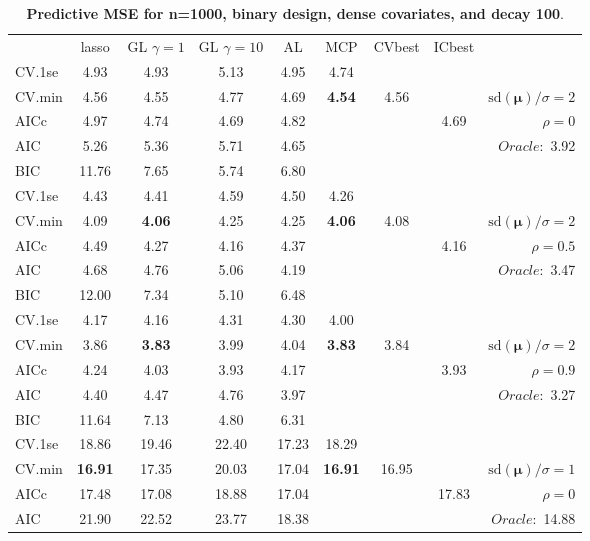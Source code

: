 \clearpage
\begin{table}\vspace{-.5cm}
\caption[l]{ { \bf Predictive MSE for n=1000, binary design, 
dense covariates, and  decay  100}.}
\vspace{-.5cm}
\footnotesize{}
\begin{center}
\begin{tabular}{l*{7}{c}|r}
 & lasso & GL $\gamma=1$ & GL $\gamma=10$ & AL & MCP  & CVbest & ICbest  \\
\cline{1-9}
CV.1se & 4.93 & 4.93 & 5.13 & 4.95 & 4.74 & & & \\
CV.min & 4.56 & 4.55 & 4.77 & 4.69 & {\bf 4.54} & 4.56 & & $\mathrm{sd}(\mathbf{\mu})/\sigma=2$ \\
AICc & 4.97 & 4.74 & 4.69 & 4.82 & & & 4.69 &  $\rho=0$ \\
AIC & 5.26 & 5.36 & 5.71 & 4.65 & & & &  \multirow{2}{*}{$Oracle: $ 3.92} \\
BIC & 11.76 & 7.65 & 5.74 & 6.80 & & & &  \\
 \hline 
CV.1se & 4.43 & 4.41 & 4.59 & 4.50 & 4.26 & & & \\
CV.min & 4.09 & {\bf 4.06} & 4.25 & 4.25 & {\bf 4.06} & 4.08 & & $\mathrm{sd}(\mathbf{\mu})/\sigma=2$ \\
AICc & 4.49 & 4.27 & 4.16 & 4.37 & & & 4.16 &  $\rho=0.5$ \\
AIC & 4.68 & 4.76 & 5.06 & 4.19 & & & &  \multirow{2}{*}{$Oracle: $ 3.47} \\
BIC & 12.00 & 7.34 & 5.10 & 6.48 & & & &  \\
 \hline 
CV.1se & 4.17 & 4.16 & 4.31 & 4.30 & 4.00 & & & \\
CV.min & 3.86 & {\bf 3.83} & 3.99 & 4.04 & {\bf 3.83} & 3.84 & & $\mathrm{sd}(\mathbf{\mu})/\sigma=2$ \\
AICc & 4.24 & 4.03 & 3.93 & 4.17 & & & 3.93 &  $\rho=0.9$ \\
AIC & 4.40 & 4.47 & 4.76 & 3.97 & & & &  \multirow{2}{*}{$Oracle: $ 3.27} \\
BIC & 11.64 & 7.13 & 4.80 & 6.31 & & & &  \\
 \hline 
CV.1se & 18.86 & 19.46 & 22.40 & 17.23 & 18.29 & & & \\
CV.min & {\bf 16.91} & 17.35 & 20.03 & 17.04 & {\bf 16.91} & 16.95 & & $\mathrm{sd}(\mathbf{\mu})/\sigma=1$ \\
AICc & 17.48 & 17.08 & 18.88 & 17.04 & & & 17.83 &  $\rho=0$ \\
AIC & 21.90 & 22.52 & 23.77 & 18.38 & & & &  \multirow{2}{*}{$Oracle: $ 14.88} \\

\end{tabular}
\end{center}
\end{table}
